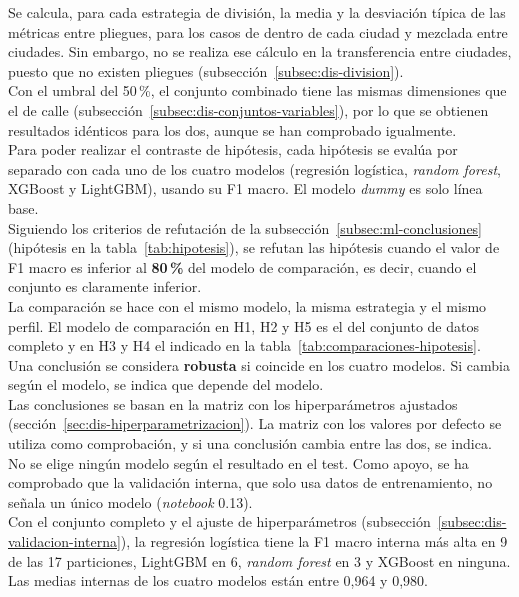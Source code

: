 Se calcula, para cada estrategia de división, la media y la desviación típica de las métricas entre pliegues, para los casos de dentro de cada ciudad y mezclada entre ciudades. Sin embargo, no se realiza ese cálculo en la transferencia entre ciudades, puesto que no existen pliegues (subsección~\ref{subsec:dis-division}).
\\

Con el umbral del 50\,\%, el conjunto combinado tiene las mismas dimensiones que el de calle (subsección~\ref{subsec:dis-conjuntos-variables}), por lo que se obtienen resultados idénticos para los dos, aunque se han comprobado igualmente.
\\

Para poder realizar el contraste de hipótesis, cada hipótesis se evalúa por separado con cada uno de los cuatro modelos (regresión logística, \textit{random forest}, XGBoost y LightGBM), usando su F1 macro. El modelo \textit{dummy} es solo línea base.
\\

Siguiendo los criterios de refutación de la subsección~\ref{subsec:ml-conclusiones} (hipótesis en la tabla~\ref{tab:hipotesis}), se refutan las hipótesis cuando el valor de F1 macro es inferior al \textbf{80\,\%} del modelo de comparación, es decir, cuando el conjunto es claramente inferior.
\\

La comparación se hace con el mismo modelo, la misma estrategia y el mismo perfil. El modelo de comparación en H1, H2 y H5 es el del conjunto de datos completo y en H3 y H4 el indicado en la tabla~\ref{tab:comparaciones-hipotesis}.
\\

Una conclusión se considera \textbf{robusta} si coincide en los cuatro modelos. Si cambia según el modelo, se indica que depende del modelo.
\\

Las conclusiones se basan en la matriz con los hiperparámetros ajustados (sección~\ref{sec:dis-hiperparametrizacion}). La matriz con los valores por defecto se utiliza como comprobación, y si una conclusión cambia entre las dos, se indica.
\\

No se elige ningún modelo según el resultado en el test. Como apoyo, se ha comprobado que la validación interna, que solo usa datos de entrenamiento, no señala un único modelo (\textit{notebook} 0.13).
\\

Con el conjunto completo y el ajuste de hiperparámetros (subsección~\ref{subsec:dis-validacion-interna}), la regresión logística tiene la F1 macro interna más alta en 9 de las 17 particiones, LightGBM en 6, \textit{random forest} en 3 y XGBoost en ninguna. Las medias internas de los cuatro modelos están entre 0,964 y 0,980.
\\

